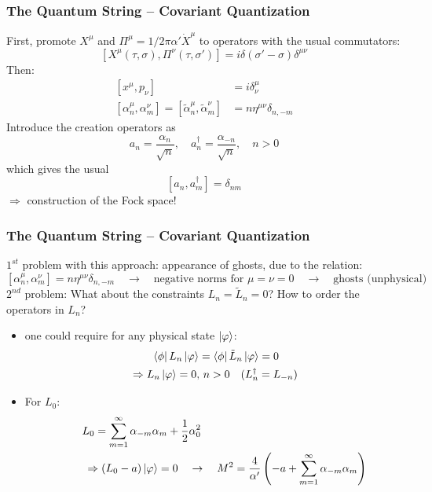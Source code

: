 \documentclass[aspectratio=169]{beamer}
\begin{document}
	\begin{frame}
		\frametitle{The Quantum String -- Covariant Quantization}
		First, promote $X^\mu$ and $\Pi^\mu = 1/2\pi\alpha' \dot{X}^\mu$ to operators with the usual commutators:
		\begin{equation*}
			\left[X^\mu(\tau,\sigma), \Pi^\nu(\tau,\sigma')\right] = i\delta(\sigma'-\sigma)\delta^{\mu\nu}
		\end{equation*}
		Then:
		\begin{align*}
			\left[x^\mu,p_\nu\right] &= i\delta^\mu_\nu \\
			\left[\alpha^\mu_n, \alpha^\nu_m\right] = \left[\tilde{\alpha}^\mu_n, \tilde{\alpha}^\nu_m\right] &= n \eta^{\mu\nu} \delta_{n,-m}
		\end{align*}
		Introduce the creation operators as
		\begin{equation*}
			a_n = \frac{\alpha_n}{\sqrt{n}}, \quad a^\dagger_n = \frac{\alpha_{-n}}{\sqrt{n}}, \quad n>0
		\end{equation*}
		which gives the usual
		\begin{equation*}
			\left[a_n,a^\dagger_m\right] = \delta_{nm}
		\end{equation*}
		$\Rightarrow$ construction of the Fock space!
	\end{frame}

	\begin{frame}
		\frametitle{The Quantum String -- Covariant Quantization}
		$1^{st}$ problem with this approach: appearance of ghosts, due to the relation:
		\begin{equation*}
			\left[\alpha^\mu_n, \alpha^\nu_m\right] = n \eta^{\mu\nu} \delta_{n,-m} \quad \rightarrow \quad \text{negative norms for } \mu=\nu=0 \quad \rightarrow \quad \text{ghosts (unphysical)}
		\end{equation*}
		$2^{nd}$ problem: What about the constraints $L_n = \tilde{L}_n = 0$? How to order the operators in $L_n$?
		\begin{itemize}
			\item one could require for any physical state $\ket{\varphi}$:
			\begin{align*}
				&\qquad \bra{\phi}L_n\ket{\varphi} = \bra{\phi}\tilde{L}_n\ket{\varphi} = 0 \\
				& \Rightarrow L_n\ket{\varphi} = 0, \, n>0 \quad (L^\dagger_n = L_{-n}) \\
			\end{align*}
			\item For $L_0$:
			\begin{align*}
				 \qquad L_0 = \sum_{m=1}^{\infty} \alpha_{-m} \alpha_m + \frac{1}{2} &\alpha^2_0 \\
				 \Rightarrow (L_0 - a)\ket{\varphi} = 0 \quad & \rightarrow \quad  M^2 = \frac{4}{\alpha'} \left(-a+\sum_{m=1}^{\infty}\alpha_{-m}\alpha_m\right) \\
			\end{align*}
		\end{itemize}
	\end{frame}
\end{document}
